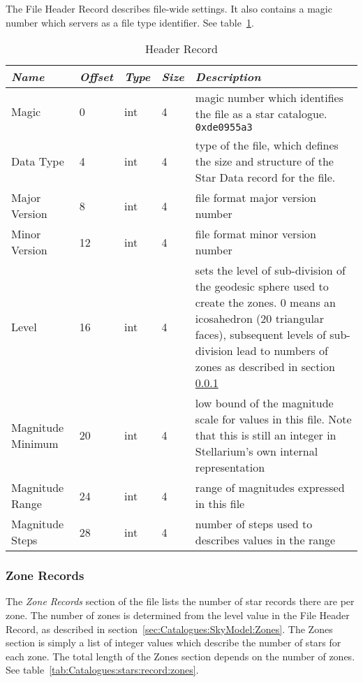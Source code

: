 The File Header Record describes file-wide settings. It also contains a
magic number which servers as a file type identifier. See table~\ref{tab:Catalogues:stars:record:header}.

\begin{table}[htbp]
\begin{tabularx}{\textwidth}{llllX}\toprule
\emph{Name} & \emph{Offset} & \emph{Type} & \emph{Size} & \emph{Description}\\\midrule
Magic             &  0 & int & 4 & magic number which identifies the file as a star catalogue. \texttt{0xde0955a3}\\%
Data Type         &  4 & int & 4 & type of the file, which defines the size and structure 
                                   of the Star Data record for the file.\\%
Major Version     &  8 & int & 4 & file format major version number\\%
Minor Version     & 12 & int & 4 & file format minor version number\\%
Level             & 16 & int & 4 & sets the level of sub-division of the geodesic sphere used to create the zones. 
                                   0 means an icosahedron (20 triangular faces), 
                                   subsequent levels of sub-division lead to numbers of zones 
                                   as described in section \ref{sec:Catalogues:stars:record:zone}\\%
Magnitude Minimum & 20 & int & 4 &  low bound of the magnitude scale for values in this file. 
                                   Note that this is still an integer in Stellarium's own internal representation\\%
Magnitude Range   & 24 & int & 4 & range of magnitudes expressed in this file\\%
Magnitude Steps   & 28 & int & 4 & number of steps used to describes values in the range\\\bottomrule
\end{tabularx}
\caption{Header Record}
\label{tab:Catalogues:stars:record:header}
\end{table}

\subsubsection{Zone Records}%
\label{sec:Catalogues:stars:record:zone}

The \emph{Zone Records} section of the file lists the number of star
records there are per zone. The number of zones is determined from the
level value in the File Header Record, as described in
section~\ref{sec:Catalogues:SkyModel:Zones}. The Zones section is
simply a list of integer values which describe the number of stars for
each zone. The total length of the Zones section depends on the number
of zones. See table~\ref{tab:Catalogues:stars:record:zones}.

